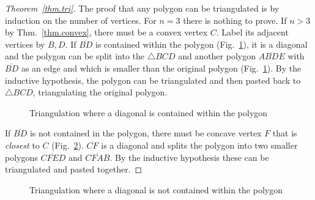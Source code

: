 \begin{proof}[Theorem~\ref{thm.tri}]
The proof that any polygon can be triangulated is by induction on the number of vertices. For $n=3$ there is nothing to prove. If $n>3$ by Thm.~\ref{thm.convex}, there must be a convex vertex $C$. Label its adjacent vertices by $B,D$. If $\overline{BD}$ is contained within the polygon (Fig.~\ref{f.contained}), it is a diagonal and the polygon can be split into the $\triangle BCD$ and another polygon $\overline{ABDE}$ with $\overline{BD}$ as an edge and which is smaller than the original polygon (Fig.~\ref{f.contained}). By the inductive hypothesis, the polygon can be triangulated and then pasted back to $\triangle BCD$, triangulating the original polygon.

\begin{figure}[t]
\begin{center}
\end{center}
\caption{Triangulation where a diagonal is contained within the polygon}\label{f.contained}
\end{figure}
If $\overline{BD}$ is not contained in the polygon, there must be concave vertex $F$ that is \emph{closest} to $C$ (Fig.~\ref{f.museum.concave-vertices}). $\overline{CF}$ is a diagonal and splits the polygon into two smaller polygons $\overline{CFED}$ and $\overline{CFAB}$. By the inductive hypothesis these can be triangulated and pasted together.
\end{proof}

\begin{figure}[t]
\begin{center}
\end{center}
\caption{Triangulation where a diagonal is not contained within the polygon}\label{f.museum.concave-vertices}
\end{figure}

